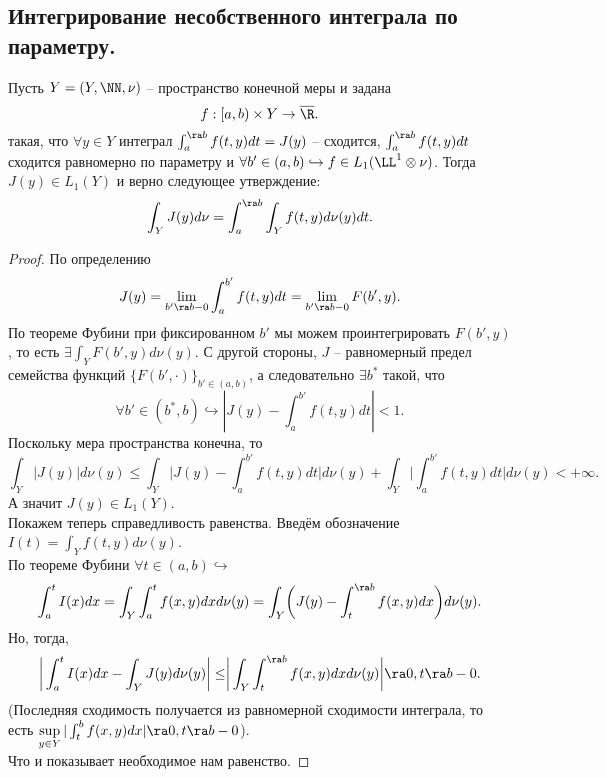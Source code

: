 \subsection{Интегрирование несобственного интеграла по параметру.}
\begin{theorem}
    Пусть $Y = (Y, \NN, \nu)$ -- пространство конечной меры и задана
    \[
        f: [a, b) \times Y \to \overline{\R}.
    \]
    такая, что $\forall y \in Y$ интеграл $\int_a^{\ra b} f(t, y)dt = J(y)$ -- сходится, $\int_a^{\ra b}f(t, y)dt$ сходится равномерно по параметру и $\forall b' \in (a, b) \hookrightarrow f \in L_1(\LL^1 \otimes \nu)$.
    Тогда $J(y) \in L_1(Y)$ и верно следующее утверждение:
    \[
        \int_Y J(y)d\nu = \int_a^{\ra b} \int_Y f(t, y)d\nu(y)dt.
    \]
\end{theorem}
\begin{proof}
    По определению
    \[
        J(y) = \lim\limits_{b' \ra b - 0} \int_a^{b'}f(t, y)dt = \lim\limits_{b' \ra b - 0} F(b', y).
    \]
    По теореме Фубини при фиксированном $b'$ мы можем проинтегрировать $F(b', y)$, то есть $\exists \int_Y F(b', y)d\nu(y)$.
    С другой стороны, $J$ -- равномерный предел семейства функций $\{F(b', \cdot)\}_{b' \in (a, b)}$, а следовательно $\exists b^*$ такой, что
    \[
        \forall b' \in (b^*, b) \hookrightarrow |J(y) - \int_a^{b'} f(t, y)dt| < 1.
    \]
    Поскольку мера пространства конечна, то
    \[
        \int_Y |J(y)|d\nu(y) \leq \int_Y \biggr|J(y) - \int_a^{b'}f(t, y)dt\biggr|d\nu(y) + \int_Y\biggr|\int_a^{b'}f(t, y)dt\biggr|d\nu(y) < +\infty.
    \]
    А значит $J(y) \in L_1(Y)$. \\ %
    Покажем теперь справедливость равенства.
    Введём обозначение $I(t) = \int_Y f(t, y)d\nu(y)$. \\
    По теореме Фубини $\forall t \in (a, b) \hookrightarrow$
    \[
        \int_a^t I(x)dx = \int_Y \int_a^t f(x, y)dxd\nu(y) = \int_Y \biggr(J(y) - \int_t^{\ra b}f(x, y)dx \biggr) d\nu(y).
    \]
    Но, тогда,
    \[
        \biggr| \int_a^t I(x)dx - \int_Y J(y)d\nu(y) \biggr| \leq \biggr|\int_Y \int_t^{\ra b} f(x, y)dx d\nu(y) \biggr| \ra 0, t \ra b - 0.
    \]
    (Последняя сходимость получается из равномерной сходимости интеграла, то есть $\sup\limits_{y \in Y} |\int_t^b f(x, y)dx| \ra 0, t \ra b - 0$). \\
    Что и показывает необходимое нам равенство.
\end{proof}

